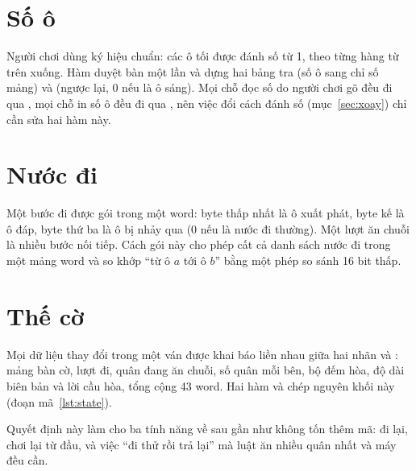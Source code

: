 \section{Số ô}

Người chơi dùng ký hiệu chuẩn: các ô tối được đánh số từ 1, theo từng hàng từ trên xuống. Hàm  duyệt bàn một lần và dựng hai bảng tra  (số ô sang chỉ số mảng) và  (ngược lại, 0 nếu là ô sáng). Mọi chỗ đọc số do người chơi gõ đều đi qua , mọi chỗ in số ô đều đi qua , nên việc đổi cách đánh số (mục~\ref{sec:xoay}) chỉ cần sửa hai hàm này.

\section{Nước đi}

Một bước đi được gói trong một word: byte thấp nhất là ô xuất phát, byte kế là ô đáp, byte thứ ba là ô bị nhảy qua (0 nếu là nước đi thường). Một lượt ăn chuỗi là nhiều bước nối tiếp. Cách gói này cho phép cất cả danh sách nước đi trong một mảng word và so khớp ``từ ô $a$ tới ô $b$'' bằng một phép so sánh 16 bit thấp.

\section{Thế cờ}\label{sec:state}

Mọi dữ liệu thay đổi trong một ván được khai báo liền nhau giữa hai nhãn  và : mảng bàn cờ, lượt đi, quân đang ăn chuỗi, số quân mỗi bên, bộ đếm hòa, độ dài biên bản và lời cầu hòa, tổng cộng 43 word. Hai hàm  và  chép nguyên khối này (đoạn mã~\ref{lst:state}).


Quyết định này làm cho ba tính năng về sau gần như không tốn thêm mã: đi lại, chơi lại từ đầu, và việc ``đi thử rồi trả lại'' mà luật ăn nhiều quân nhất và máy đều cần.
